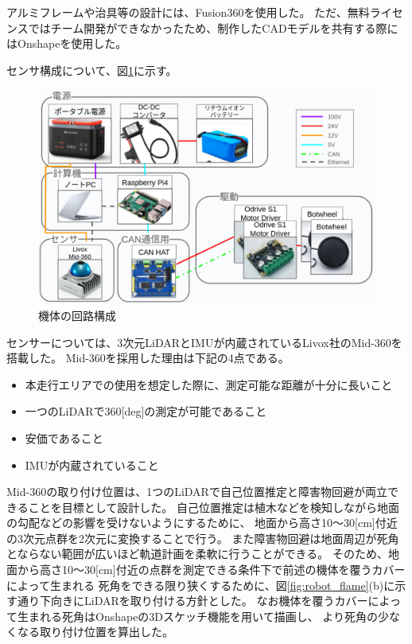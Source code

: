 \documentclass[twocolumn,9pt]{jsproceedings}
\begin{document}
アルミフレームや治具等の設計には、Fusion360\cite{Fusion360}を使用した。
ただ、無料ライセンスではチーム開発ができなかったため、制作したCADモデルを共有する際にはOnshape\cite{Onshape}を使用した。


センサ構成について、図\ref{fig:botwheel-explorer-schematic}に示す。
\begin{figure}[h]
  \begin{center}
    \includegraphics[width=1.0\linewidth]{figs/botwheel-explorer-schematic.pdf}
    \caption{機体の回路構成}
    \label{fig:botwheel-explorer-schematic}
  \end{center}
\end{figure}

センサーについては、3次元LiDARとIMUが内蔵されているLivox社のMid-360を搭載した。
Mid-360を採用した理由は下記の4点である。

\begin{itemize}
  \item[1] 本走行エリアでの使用を想定した際に、測定可能な距離が十分に長いこと
  \item[2] 一つのLiDARで360[deg]の測定が可能であること
  \item[3] 安価であること
  \item[4] IMUが内蔵されていること
\end{itemize}

Mid-360の取り付け位置は、1つのLiDARで自己位置推定と障害物回避が両立できることを目標として設計した。
自己位置推定は植木などを検知しながら地面の勾配などの影響を受けないようにするために、
地面から高さ10〜30[cm]付近の3次元点群を2次元に変換することで行う。
また障害物回避は地面周辺が死角とならない範囲が広いほど軌道計画を柔軟に行うことができる。
そのため、地面から高さ10〜30[cm]付近の点群を測定できる条件下で前述の機体を覆うカバーによって生まれる
死角をできる限り狭くするために、図\ref{fig:robot_flame}(b)に示す通り下向きにLiDARを取り付ける方針とした。
なお機体を覆うカバーによって生まれる死角はOnshapeの3Dスケッチ機能を用いて描画し、
より死角の少なくなる取り付け位置を算出した。
\end{document}
